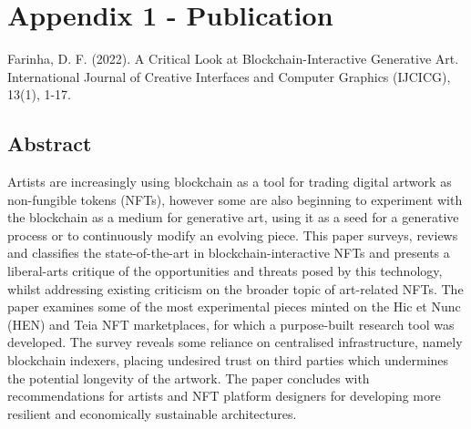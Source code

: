 \chapter*{Appendix 1 - Publication}
\label{chap:publication}





Farinha, D. F. (2022). A Critical Look at Blockchain-Interactive Generative Art. International Journal of Creative Interfaces and Computer Graphics (IJCICG), 13(1), 1-17.

\section*{Abstract}

Artists are increasingly using blockchain as a tool for trading digital artwork as non-fungible tokens (NFTs), however some are also beginning to experiment with the blockchain as a medium for generative art, using it as a seed for a generative process or to continuously modify an evolving piece. This paper surveys, reviews and classifies the state-of-the-art in blockchain-interactive NFTs and presents a liberal-arts critique of the opportunities and threats posed by this technology, whilst addressing existing criticism on the broader topic of art-related NFTs. The paper examines some of the most experimental pieces minted on the Hic et Nunc (HEN) and Teia NFT marketplaces, for which a purpose-built research tool was developed. The survey reveals some reliance on centralised infrastructure, namely blockchain indexers, placing undesired trust on third parties which undermines the potential longevity of the artwork. The paper concludes with recommendations for artists and NFT platform designers for developing more resilient and economically sustainable architectures.

